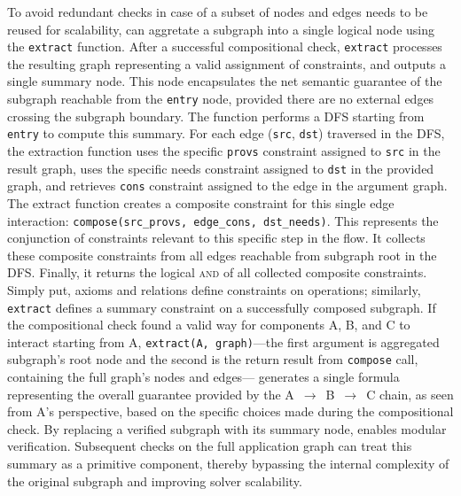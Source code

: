 To avoid redundant checks in case of a subset of nodes and edges needs to be reused for scalability,
\sysname{} can aggretate a subgraph into a single logical node using the \texttt{extract} function.
After a successful compositional check, \texttt{extract} processes the resulting graph
representing a valid assignment of constraints, and outputs a single summary node.
This node encapsulates the net semantic guarantee of the subgraph reachable from the 
\texttt{entry} node, provided there are no external edges crossing the subgraph boundary.
The function performs a DFS starting from \texttt{entry} to compute this summary.
For each edge (\texttt{src}, \texttt{dst})
traversed in the DFS, the extraction function uses the specific \texttt{provs}
constraint assigned to \texttt{src} in the result graph, uses the specific
needs constraint assigned to \texttt{dst} in the provided graph, and retrieves
\texttt{cons} constraint assigned to the edge in
the argument graph. The extract function creates a composite constraint
for this single edge interaction: \texttt{compose(src\_provs, edge\_cons,
dst\_needs)}. This represents the conjunction of constraints relevant
to this specific step in the flow. It collects these composite
constraints from all edges reachable from subgraph root in the DFS. Finally,
it returns the logical \textsc{and} of all collected composite
constraints. Simply put, axioms and relations define constraints on
operations; similarly, \texttt{extract} defines a summary constraint on a
successfully composed subgraph. If the compositional check found a valid
way for components A, B, and C to interact starting from A,
\texttt{extract(A, graph)}---the first argument is aggregated subgraph's root node and the second is the return result from 
\texttt{compose} call, containing the full graph's nodes and edges---%
generates a single formula representing the
overall guarantee provided by the A $\,\to\,$ B $\,\to\,$ C chain, as seen from A's
perspective, based on the specific choices made during the compositional check.
By replacing a verified subgraph with its summary node, \sysname{} enables modular verification.
Subsequent checks on the full application graph can treat this summary as a primitive component,
thereby bypassing the internal complexity of the original subgraph and improving solver scalability.


